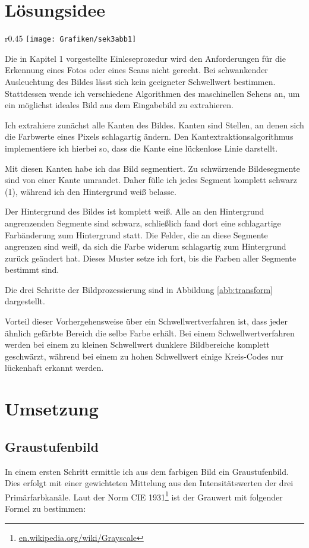 \section{Lösungsidee}
\begin{wrapfigure}{r}{0.45\textwidth}
	\setlength\intextsep{0pt}
	\centering	
	\texttt{[image: Grafiken/sek3abb1]}
	\caption{Verbesserte Bilderkennung}
	\label{abb:transform}
\end{wrapfigure}
Die in Kapitel 1 vorgestellte Einleseprozedur wird den Anforderungen für die Erkennung eines Fotos oder eines Scans nicht gerecht. Bei schwankender Ausleuchtung des Bildes lässt sich kein geeigneter Schwellwert bestimmen. Stattdessen wende ich verschiedene Algorithmen des maschinellen Sehens an, um ein möglichst ideales Bild aus dem Eingabebild zu extrahieren.

Ich extrahiere zunächst alle Kanten des Bildes. Kanten sind Stellen, an denen sich die Farbwerte eines Pixels schlagartig ändern. Den Kantextraktionsalgorithmus implementiere ich hierbei so, dass die Kante eine lückenlose Linie darstellt.

Mit diesen Kanten habe ich das Bild segmentiert. Zu schwärzende Bildesegmente sind von einer Kante umrandet. Daher fülle ich jedes Segment komplett schwarz (1), während ich den Hintergrund weiß belasse.

Der Hintergrund des Bildes ist komplett weiß. Alle an den Hintergrund angrenzenden Segmente sind schwarz, schließlich fand dort eine schlagartige Farbänderung zum Hintergrund statt. Die Felder, die an diese Segmente angrenzen sind weiß, da sich die Farbe widerum schlagartig zum Hintergrund zurück geändert hat. Dieses Muster setze ich fort, bis die Farben aller Segmente bestimmt sind.

Die drei Schritte der Bildprozessierung sind in Abbildung \ref{abb:transform} dargestellt.

Vorteil dieser Vorhergehensweise über ein Schwellwertverfahren ist, dass jeder ähnlich gefärbte Bereich die selbe Farbe erhält. Bei einem Schwellwertverfahren werden bei einem zu kleinen Schwellwert dunklere Bildbereiche komplett geschwärzt, während bei einem zu hohen Schwellwert einige Kreis-Codes nur lückenhaft erkannt werden.
 
\section{Umsetzung}
\subsection{Graustufenbild}
In einem ersten Schritt ermittle ich aus dem farbigen Bild ein Graustufenbild. Dies erfolgt mit einer gewichteten Mittelung aus den Intensitätswerten der drei Primärfarbkanäle. Laut der Norm CIE 1931\footnote{\url{en.wikipedia.org/wiki/Grayscale}} ist der Grauwert mit folgender Formel zu bestimmen:

